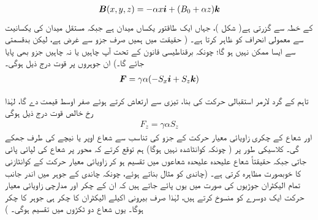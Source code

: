 \begin{align}
{\ensuremath{{\boldsymbol{B}}}} (x, y, z) = - \alpha x {\boldsymbol{i}} + (B_0 + \alpha z) {\boldsymbol{k}}
\end{align}
کے خطہ سے گزرتی ہے( شکل  )، جہاں  ایک طاقتور یکساں میدان ہے جبکہ مستقل  میدان کی یکسانیت سے معمولی انحراف کو ظاہر کرتا ہے۔ ( حقیقت میں ہمیں صرف  جزو سے غرض ہے، لیکن بدقسمتی سے ایسا ممکن نہیں ہو گا؛ چونکہ برقناطیسی قانون  کے تحت آپ چاہیں یا نہ چاہیں  جزو بھی پایا جائے گا۔) ان جوہروں پر قوت درج ذیل ہوگی۔
\begin{align*}
{\ensuremath{{\boldsymbol{F}}}} = \gamma \alpha (- S_x {\boldsymbol{i}} + S_z {\boldsymbol{k}})
\end{align*}

 تاہم  کے گرد لارمر استقبالی حرکت کی بنا،  تیزی سے ارتعاش کرتے ہوئے صفر اوسط قیمت دے گا، لہٰذا  رخ خالص قوت درج ذیل ہوگی 
\begin{align}\label{مساوات_تین_ابعادی_کونٹائی_زیڈ_قوت}
F_z = \gamma \alpha S_z
\end{align}
اور شعاع کے چکری زاویائی معیار حرکت کے  جزو کی تناسب سے شعاع اوپر یا نیچے کی طرف جھکے گی۔ کلاسیکی طور پر ( چونکہ  کوانٹاشدہ نہیں ہوگا) ہم توقع کرتے کہ محور  پر شعاع کی لپائی پائی جاتی جبکہ حقیقتاً شعاع  علیحدہ علیحدہ شعاعوں میں تقسیم ہو کر زاویائی معیار حرکت کے کوانٹازنی کا خوبصورت مظاہرہ کرتی ہے۔ (چاندی کو مثال بناتے ہوئے، چونکہ چاندی کے جوہر میں اندر جانب تمام الیکٹران جوڑیوں کی صورت میں یوں پائے جاتے ہیں کہ ان کے چکر اور مدارچی زاویائی معیار حرکت ایک دوسرے کو منسوخ کرتے ہیں، لہٰذا صرف بیرونی اکیلے الیکٹران کا چکر  ہی جوہر کا چکر ہوگا۔ یوں شعاع دو ٹکڑوں میں تقسیم ہوگی۔ )

